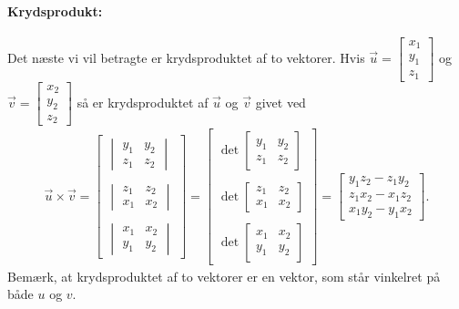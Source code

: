 \paragraph*{Krydsprodukt:}
Det næste vi vil betragte er krydsproduktet af to vektorer. Hvis $\vec{u} = \begin{bmatrix} x_1 \\ y_1 \\ z_1 \end{bmatrix}$ og $\vec{v} = \begin{bmatrix} x_2 \\ y_2 \\ z_2 \end{bmatrix}$ så er krydsproduktet af $\vec{u}$ og $\vec{v}$ givet ved
\begin{align}\label{eq:vec3d1krydsprodukt}
\vec{u} \times \vec{v} = \begin{bmatrix}
\begin{vmatrix}
y_1 & y_2 \\
z_1 & z_2
\end{vmatrix}
\\
\\
\begin{vmatrix}
z_1 & z_2 \\
x_1 & x_2
\end{vmatrix}
\\
\\
\begin{vmatrix}
x_1 & x_2 \\
y_1 & y_2
\end{vmatrix}
\end{bmatrix}
=\begin{bmatrix}
\det\begin{bmatrix}
y_1 & y_2 \\
z_1 & z_2
\end{bmatrix}
\\
\\
\det\begin{bmatrix}
z_1 & z_2 \\
x_1 & x_2
\end{bmatrix}
\\
\\
\det\begin{bmatrix}
x_1 & x_2 \\
y_1 & y_2
\end{bmatrix}
\end{bmatrix}
=
\begin{bmatrix}
y_1z_2 - z_1y_2 \\
z_1x_2 - x_1z_2 \\
x_1y_2 - y_1x_2
\end{bmatrix}.
\end{align}
Bemærk, at krydsproduktet af to vektorer er en vektor, som står vinkelret på både $u$ og $v$.

